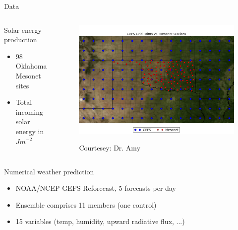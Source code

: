 \documentclass[handout]{beamer}
\begin{document}
\begin{frame}{Data}

\begin{columns}[T]
    \begin{column}{.45\textwidth}

\begin{block}{Solar energy production}
  \begin{itemize}
     \item 98 Oklahoma Mesonet sites
     \item Total incoming solar energy in $J m^{-2}$
  \end{itemize}
\end{block}

    \end{column}
    \begin{column}{.45\textwidth}

  \begin{figure}
    \includegraphics[width=\textwidth]{images/gefs_mesonet_stations.png}\\
    \begin{right}
    {\tiny{Courtesey: Dr. Amy}}
    \end{right}
  \end{figure}

    \end{column}
  \end{columns}

\begin{block}{Numerical weather prediction}
\begin{itemize}
     \item NOAA/NCEP GEFS Reforecast, 5 forecasts per day
     \item Ensemble comprises 11 members (one control)
     \item 15 variables (temp, humidity, upward radiative flux, ...)
  \end{itemize}
\end{block}

\end{frame}
\end{document}

